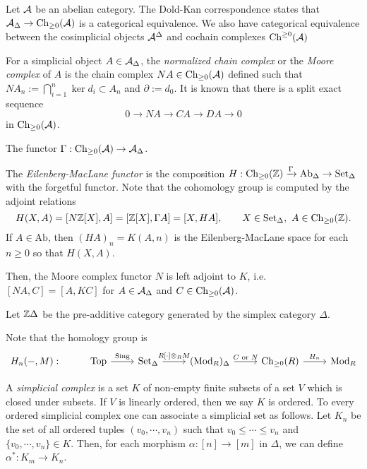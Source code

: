 \documentclass{../../large}
\begin{document}
\begin{prb}
Let $\mathcal{A}$ be an abelian category.
The Dold-Kan correspondence states that $\mathcal{A}_\Delta\to\mathrm{Ch}_{\ge0}(\mathcal{A})$ is a categorical equivalence.
We also have categorical equivalence between the cosimplicial objects $\mathcal{A}^\Delta$ and cochain complexes $\mathrm{Ch}^{\ge0}(\mathcal{A})$

For a simplicial object $A\in\mathcal{A}_\Delta$, the \emph{normalized chain complex} or the \emph{Moore complex} of $A$ is the chain complex $NA\in\mathrm{Ch}_{\ge0}(\mathcal{A})$ defined such that $NA_n:=\bigcap_{i=1}^n\ker d_i\subset A_n$ and $\partial:=d_0$.
It is known that there is a split exact sequence
\[0\to NA\to CA\to DA\to0\]
in $\mathrm{Ch}_{\ge0}(\mathcal{A})$.


The functor $\Gamma:\mathrm{Ch}_{\ge0}(\mathcal{A})\to\mathcal{A}_\Delta$.

The \emph{Eilenberg-MacLane functor} is the composition $H:\mathrm{Ch}_{\ge0}(\mathbb{Z})\xrightarrow{\Gamma}\mathrm{Ab}_\Delta\to\mathrm{Set}_\Delta$ with the forgetful functor.
Note that the cohomology group is computed by the adjoint relations
\[H(X,A)=[N\mathbb{Z}[X],A]=[\mathbb{Z}[X],\Gamma A]=[X,HA],\qquad X\in\mathrm{Set}_\Delta,\ A\in\mathrm{Ch}_{\ge0}(\mathbb{Z}).\]
If $A\in\mathrm{Ab}$, then $(HA)_n=K(A,n)$ is the Eilenberg-MacLane space for each $n\ge0$ so that $H(X,A)$.

Then, the Moore complex functor $N$ is left adjoint to $K$, i.e.~$[NA,C]=[A,KC]$ for $A\in\mathcal{A}_\Delta$ and $C\in\mathrm{Ch}_{\ge0}(\mathcal{A})$.
\end{prb}
\begin{pf}
Let $\mathbb{Z}\Delta$ be the pre-additive category generated by the simplex category $\Delta$.
\end{pf}


Note that the homology group is
\[\begin{tikzcd}
H_n(-,M):&
\mathrm{Top} \rar{\mathrm{Sing}} &
\mathrm{Set}_\Delta \rar{R[\cdot]\otimes_RM} &
(\mathrm{Mod}_R)_\Delta \rar{C\text{ or }N} &
\mathrm{Ch}_{\ge0}(R) \rar{H_n} &
\mathrm{Mod}_R
\end{tikzcd}\]



\begin{prb}
A \emph{simplicial complex} is a set $K$ of non-empty finite subsets of a set $V$ which is closed under subsets.
If $V$ is linearly ordered, then we say $K$ is ordered.
To every ordered simplicial complex one can associate a simplicial set as follows.
Let $K_n$ be the set of all ordered tuples $(v_0,\cdots,v_n)$ such that $v_0\le\cdots\le v_n$ and $\{v_0,\cdots,v_n\}\in K$.
Then, for each morphism $\alpha:[n]\to[m]$ in $\Delta$, we can define $\alpha^*:K_m\to K_n$.

\end{prb}
\end{document}
